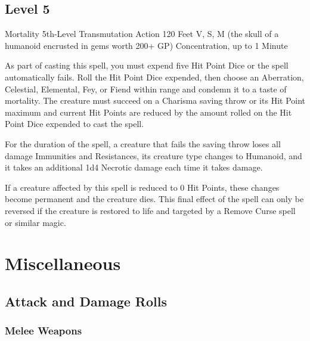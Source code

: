 \documentclass[letterpaper,openany,oneside,twocolumn]{book}
\begin{document}
\subsection*{Level 5}

\DndSpellHeader
  {Mortality}
  {5th-Level Transmutation}
  {Action}
  {120 Feet}
  {V, S, M (the skull of a humanoid encrusted in gems worth 200+ GP)}
  {Concentration, up to 1 Minute}

As part of casting this spell, you must expend five Hit Point Dice or the spell automatically fails. Roll the Hit Point Dice expended, then choose an Aberration, Celestial, Elemental, Fey, or Fiend within range and condemn it to a taste of mortality. The creature must succeed on a Charisma saving throw or its Hit Point maximum and current Hit Points are reduced by the amount rolled on the Hit Point Dice expended to cast the spell.

For the duration of the spell, a creature that fails the saving throw loses all damage Immunities and Resistances, its creature type changes to Humanoid, and it takes an additional 1d4 Necrotic damage each time it takes damage.

If a creature affected by this spell is reduced to 0 Hit Points, these changes become permanent and the creature dies. This final effect of the spell can only be reversed if the creature is restored to life and targeted by a Remove Curse spell or similar magic.
  
\vfill\eject
\section*{Miscellaneous}
\subsection*{Attack and Damage Rolls}
\subsubsection*{Melee Weapons}
\end{document}
